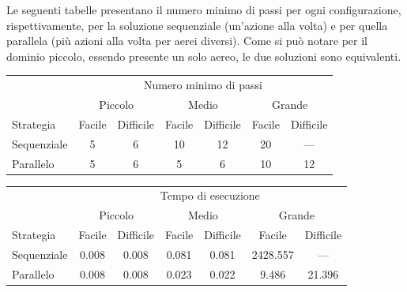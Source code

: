 \documentclass[a4paper,oneside,12pt]{book}
\begin{document}
    Le seguenti tabelle presentano il numero minimo di passi per ogni configurazione, rispettivamente, per la soluzione
    sequenziale (un'azione alla volta) e per quella parallela (più azioni alla volta per aerei diversi).
    Come si può notare per il dominio piccolo, essendo presente un solo aereo, le due soluzioni sono equivalenti.
    \begin{center}

        \begin{tabular}{l c c c c c c}
            \toprule %
            &\multicolumn{6}{c}{Numero minimo di passi} \\
            \cmidrule(l){2-7}
            & \multicolumn{2}{c}{Piccolo} & \multicolumn{2}{c}{Medio} & \multicolumn{2}{c}{Grande} \\
            \cmidrule(l){2-7}
            Strategia & Facile & Difficile & Facile & Difficile & Facile & Difficile\\
            \midrule
            Sequenziale &5  &6  &10 &12 & 20    & ---\\ %
            Parallelo   &5  &6  &5  &6  & 10    & 12\\ %

            \bottomrule
        \end{tabular}
    \end{center}

    \begin{center}
        \begin{tabular}{l c c c c c c}
            \toprule %
            &\multicolumn{6}{c}{Tempo di esecuzione} \\
            \cmidrule(l){2-7}
            & \multicolumn{2}{c}{Piccolo} & \multicolumn{2}{c}{Medio} & \multicolumn{2}{c}{Grande} \\
            \cmidrule(l){2-7}
            Strategia & Facile & Difficile & Facile & Difficile & Facile & Difficile\\
            \midrule
            Sequenziale & 0.008 & 0.008 & 0.081 & 0.081 & 2428.557  & --- \\ %
            Parallelo   & 0.008 & 0.008 & 0.023 & 0.022 & 9.486     & 21.396\\ %

            \bottomrule
        \end{tabular}
    \end{center}

    \newpage
    \noindent
\end{document}
